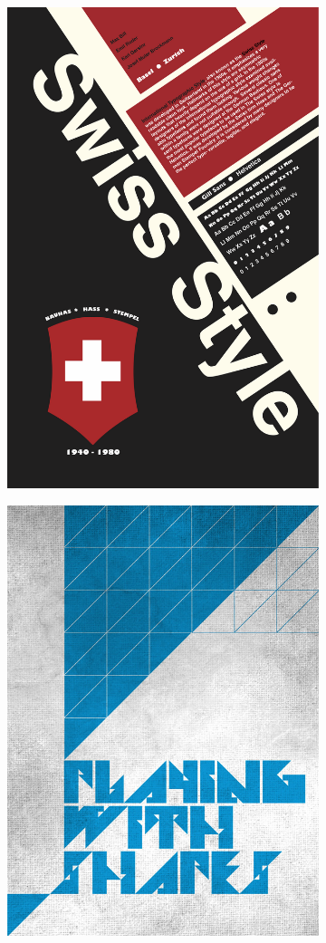 \documentclass{article}
\begin{document}
\begin{figure}[h!]
\centering
\begin{subfigure}{.3\textwidth}
  \centering
  \includegraphics[width=.8\linewidth]{SWISS.png}
\end{subfigure}%
\begin{subfigure}{.3\textwidth}
  \centering
  \includegraphics[width=.9\linewidth]{SWISS2.jpg}

\end{subfigure}
\end{figure}
\end{document}
